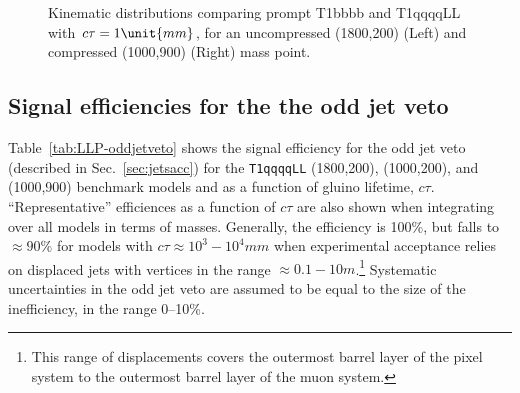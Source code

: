\begin{figure}[h!]
\begin{center}
     \\
     ~
    \caption{Kinematic distributions comparing prompt T1bbbb and
      T1qqqqLL with $\ctau = 1\unit{mm}$, for an uncompressed
      (1800,200) (Left) and compressed (1000,900) (Right) mass point.}
    \label{fig:T1qqqqLLvsT1bbbb}
  \end{center}
\end{figure}

\clearpage
\subsection{Signal efficiencies for the the odd jet veto}
\label{app:LLP-jetid}

Table~\ref{tab:LLP-oddjetveto} shows the signal efficiency for the odd
jet veto (described in Sec.~\ref{sec:jetsacc}) for the
\texttt{T1qqqqLL} (1800,200), (1000,200), and (1000,900) benchmark
models and as a function of gluino lifetime,
$c\tau$. ``Representative'' efficiences as a function of $c\tau$ are
also shown when integrating over all models in terms of masses.
Generally, the efficiency is 100\%, but falls to ${\approx}90\%$ for
models with $c\tau \approx 10^{3} - 10^{4}\unit{mm}$ when experimental
acceptance relies on displaced jets with vertices in the range
$\approx 0.1-10\unit{m}$.\footnote{This range of displacements covers
  the outermost barrel layer of the pixel system to the outermost
  barrel layer of the muon system.} Systematic uncertainties in the
odd jet veto are assumed to be equal to the size of the inefficiency,
\ie in the range 0--10\%.

